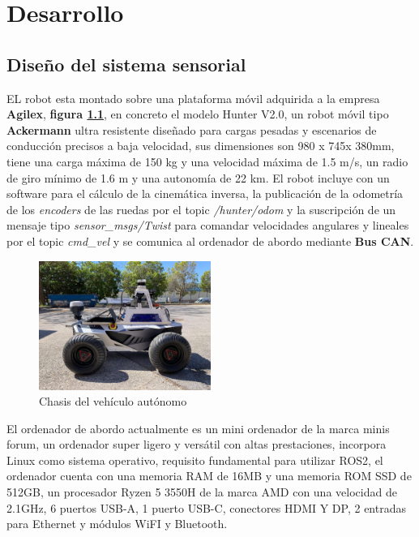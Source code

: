 \chapter{Desarrollo}

\section{Diseño del sistema sensorial}

EL robot esta montado sobre una plataforma móvil adquirida a la empresa \textbf{Agilex}, \textbf{figura \ref{fig:hunter}}, en concreto el 
modelo Hunter V2.0, un robot móvil tipo \textbf{Ackermann} ultra resistente diseñado para cargas pesadas y escenarios de conducción precisos 
a baja velocidad, sus dimensiones son 980 x 745x 380mm, tiene una carga máxima de 150 kg y una velocidad máxima de 1.5 m/s, un radio 
de giro mínimo de 1.6 m y una autonomía de 22 km. El robot incluye con un software para el cálculo de la cinemática inversa, la publicación de 
la odometría de los \textit{encoders} de las ruedas por el topic \textit{/hunter/odom} y la suscripción de un mensaje tipo \textit{sensor\_msgs/Twist} 
para comandar velocidades angulares y lineales por el topic \textit{cmd\_vel} y se comunica al ordenador de abordo mediante \textbf{Bus CAN}.

\begin{figure}[h]
    \centering
    \includegraphics[width=0.5\textwidth]{images/hunter_v2.jpeg}
    \caption{Chasis del vehículo autónomo}
    \label{fig:hunter}
\end{figure}

El ordenador de abordo actualmente es un mini ordenador de la marca minis forum, un ordenador super ligero y versátil con altas 
prestaciones, incorpora Linux como sistema operativo, requisito fundamental para utilizar ROS2, el ordenador cuenta con una 
memoria RAM de 16MB y una memoria ROM SSD de 512GB, un procesador Ryzen 5 3550H de la marca AMD con una velocidad de 2.1GHz, 6 puertos USB-A, 
1 puerto USB-C, conectores HDMI Y DP, 2 entradas para Ethernet y módulos WiFI y Bluetooth.

